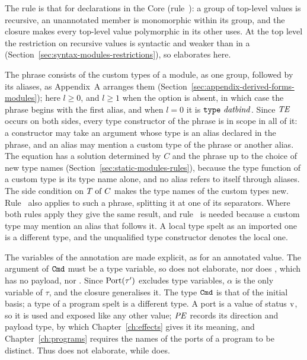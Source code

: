 \begin{rulecomments}
 The rule is that for declarations in the Core
(rule~): a group of top-level values is recursive, an
unannotated member is monomorphic within its group, and the closure makes every
top-level value polymorphic in its other uses. %
At the top level the restriction on recursive values is syntactic and weaker
than in a  (Section~\ref{sec:syntax-modules-restrictions}), so
 elaborates here. %

 The phrase consists of the custom types of a
module, as one group, followed by its aliases, as Appendix~A arranges them
(Section~\ref{sec:appendix-derived-forms-modules}); here $l \geq 0$, and $l
\geq 1$ when the option is absent, in which case the phrase begins with the
first alias, and when $l = 0$ it is $\textnormal{\texttt{type}}\ \mathit{datbind}$. Since $\mathit{TE}$ occurs
on both sides, every type constructor of the phrase is in scope in all of it: a
constructor may take an argument whose type is an alias declared in the
phrase, and an alias may mention a custom type of the phrase or another alias.
The equation has a solution determined by $C$ and the phrase up to the choice
of new type names (Section~\ref{sec:static-modules-rules}), because the type
function of a custom type is its type name alone, and no alias refers to itself
through aliases. The side condition on $T \mathrel{\mathrm{of}} C$ makes the type names of the
custom types new. Rule~ also applies to such a
phrase, splitting it at one of its separators. Where both rules apply they give
the same result, and rule~ is needed because a custom type
may mention an alias that follows it. A local type spelt as an imported one is
a different type, and the unqualified type constructor denotes the local one.

 The variables of the annotation are made
explicit, as for an annotated value. The argument of $\mathtt{Cmd}$ must be a type
variable, so  does not elaborate, nor does
, which has no payload, nor . Since $\mathrm{Port}(\tau')$ excludes type variables, $\alpha$ is the only
variable of $\tau$, and the closure generalises it. The type $\mathtt{Cmd}$ is that
of the initial basis; a type of a program spelt  is a different type.
A port is a value of status $\mathrm{v}$, so it is used and exposed like any other
value; $\mathit{PE}$ records its direction and payload type, by which
Chapter~\ref{ch:effects} gives it its meaning, and Chapter~\ref{ch:programs}
requires the names of the ports of a program to be distinct. %
Thus  does not elaborate, while  does. %


\end{rulecomments}
